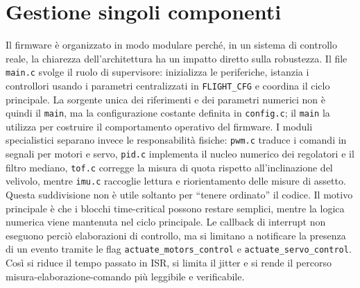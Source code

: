 \documentclass[11pt]{report}
\begin{document}
	\section{Gestione singoli componenti}
	Il firmware è organizzato in modo modulare perché, in un sistema di controllo reale, la chiarezza dell'architettura ha un impatto diretto sulla robustezza. Il file \texttt{main.c} svolge il ruolo di supervisore: inizializza le periferiche, istanzia i controllori usando i parametri centralizzati in \texttt{FLIGHT\_CFG} e coordina il ciclo principale. La sorgente unica dei riferimenti e dei parametri numerici non è quindi il \texttt{main}, ma la configurazione costante definita in \texttt{config.c}; il \texttt{main} la utilizza per costruire il comportamento operativo del firmware. I moduli specialistici separano invece le responsabilità fisiche: \texttt{pwm.c} traduce i comandi in segnali per motori e servo, \texttt{pid.c} implementa il nucleo numerico dei regolatori e il filtro mediano, \texttt{tof.c} corregge la misura di quota rispetto all'inclinazione del velivolo, mentre \texttt{imu.c} raccoglie lettura e riorientamento delle misure di assetto.\\
	Questa suddivisione non è utile soltanto per ``tenere ordinato'' il codice. Il motivo principale è che i blocchi time-critical possono restare semplici, mentre la logica numerica viene mantenuta nel ciclo principale. Le callback di interrupt non eseguono perciò elaborazioni di controllo, ma si limitano a notificare la presenza di un evento tramite le flag \texttt{actuate\_motors\_control} e \texttt{actuate\allowbreak\_servo\allowbreak\_control}. Così si riduce il tempo passato in ISR, si limita il jitter e si rende il percorso misura-elaborazione-comando più leggibile e verificabile.
\end{document}
